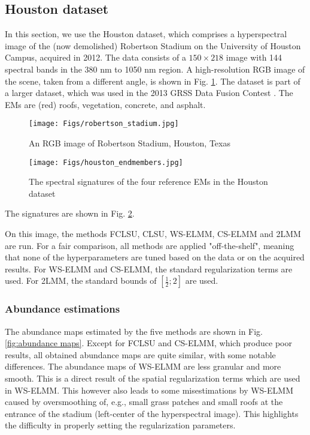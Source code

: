 \subsection{Houston dataset}

In this section, we use the Houston dataset, which comprises a hyperspectral image of the (now demolished) Robertson Stadium on the University of Houston Campus, acquired in 2012. The data consists of a  $150\times 218$ image with 144 spectral bands in the 380 nm to 1050 nm region. A high-resolution RGB image of the scene, taken from a different angle, is shown in Fig. \ref{fig:robertson stadium}. The dataset is part of a larger dataset, which was used in the 2013 GRSS Data Fusion Contest \cite{debes_hyperspectral_2014}. The EMs are (red) roofs, vegetation, concrete, and asphalt. 
\begin{figure}[t]
    \centering
    \texttt{[image: Figs/robertson\_stadium.jpg]}
    \caption{An RGB image of Robertson Stadium, Houston, Texas}
    \label{fig:robertson stadium}
\end{figure}
\begin{figure}[t]
    \centering
    \texttt{[image: Figs/houston\_endmembers.jpg]}
    \caption{The spectral signatures of the four reference EMs in the Houston dataset}
    \label{fig:reference endmembers}
\end{figure}
The signatures are shown in Fig. \ref{fig:reference endmembers}. 

On this image, the methods FCLSU, CLSU, WS-ELMM, CS-ELMM and 2LMM are run. For a fair comparison, all methods are applied "off-the-shelf", meaning that none of the hyperparameters are  tuned based on the data or on the acquired results. For WS-ELMM and CS-ELMM,  the standard regularization terms are used. For 2LMM, the standard bounds of $[\frac{1}{2}; 2]$ are used.

\subsubsection{Abundance estimations}

The abundance maps estimated by the five methods are shown in Fig. \ref{fig:abundance maps}. Except for FCLSU and CS-ELMM, which produce poor results, all obtained abundance maps are quite similar, with some notable differences. The abundance maps of WS-ELMM are less granular and more smooth. This is a direct result of the spatial regularization terms which are used in WS-ELMM. This however also leads to some misestimations by WS-ELMM caused by oversmoothing of, e.g., small grass patches and small roofs at the entrance of the stadium (left-center of the hyperspectral image). This highlights the difficulty in properly setting the regularization parameters.

